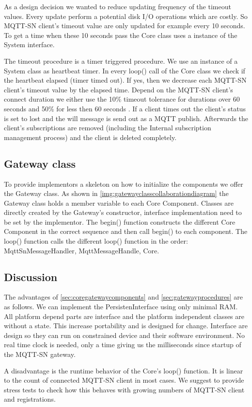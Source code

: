 As a design decision we wanted to reduce updating frequency of the timeout values.
Every update perform a potential disk I/O operations which are costly.
So MQTT-SN client's timeout value are only updated for example every 10 seconds.
To get a time when these 10 seconds pass the Core class uses a instance of the System interface.

The timeout procedure is a timer triggered procedure.
We use an instance of a System class as heartbeat timer.
In every loop() call of the Core class we check if the heartbeat elapsed (timer timed out).
If yes, then we decrease each MQTT-SN client's timeout value by the elapsed time.
Depend on the MQTT-SN client's connect duration we either use the 10\% timeout tolerance for durations over 60 seconds and 50\% for  less then 60 seconds \cite[p.27]{mqttsnstandard}.
If a client times out the client's status is set to lost and the will message is send out as a MQTT publish.
Afterwards the client's subscriptions are removed (including the Internal subscription management process) and the client is deleted completely.

\subsection{Gateway class}
To provide implementors a skeleton on how to initialize the components we offer the Gateway class.
As shown in \autoref{img:gatewayclasscollaborationdiagram} the Gateway class holds a member variable to each Core Component.
Classes are directly created by the Gateway's constructor, interface implementation need to be set by the implementor.
The begin() function constructs the different Core Component in the correct sequence and then call begin() to each component.
The loop() function calls the different loop() function in the order: MqttSnMessageHandler, MqttMessageHandle, Core.

\subsection{Discussion}
The advantages of \autoref{sec:coregatewaycomponents} and \autoref{sec:gatewayprocedures} are as follows.
We can implement the PersistenInterface using only minimal RAM.
All platform depend parts are interface and the platform independent classes are without a state.
This increase portability and is designed for change.
Interface are design so they can run on constrained device and their software environment.
No real time clock is needed, only a time giving us the milliseconds since startup of the MQTT-SN gateway.

A disadvantage is the runtime behavior of the Core's loop() function.
It is linear to the count of connected MQTT-SN client in most cases.
We suggest to provide stress tests to check how this behaves with growing numbers of MQTT-SN client and registrations.
